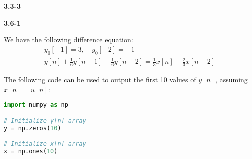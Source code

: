 \documentclass{article}
\begin{document}
\textbf{3.3-3}

\textbf{3.6-1}

We have the following difference equation:
\begin{align*}
    y_0[-1] = 3, \quad y_0[-2] = -1 \\
    y[n] + \frac{1}{6}y[n-1] - \frac{1}{6}y[n-2] = \frac{1}{3}x[n] + \frac{2}{3}x[n-2]
\end{align*}

The following code can be used to output the first 10 values of $y[n]$, assuming $x[n] = u[n]$:

\begin{lstlisting}[language=Python, label={code:p3}, caption={Python code to solve difference equation}]
import numpy as np

# Initialize y[n] array
y = np.zeros(10)

# Initialize x[n] array
x = np.ones(10)

\end{lstlisting}

\end{document}
